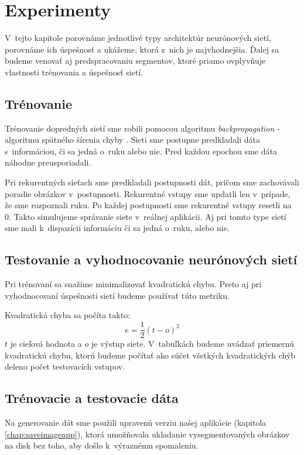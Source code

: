 \chapter{Experimenty}
\label{chap:experiments}

V~tejto kapitole porovnáme jednotlivé typy architektúr neurónových sietí, porovnáme ich úspešnosť a ukážeme, ktorá z~nich je najvhodnejšia. Ďalej sa budeme venovať aj predspracovaniu segmentov, ktoré priamo ovplyvňuje vlastnosti trénovania a úspešnosť sietí.
\bigskip

\section{Trénovanie}

Trénovanie dopredných sietí sme robili pomocou algoritmu \textit{backpropagation} - algoritmu spätného šírenia chyby \cite{haykin1999neural}. Sieti sme postupne predkladali dáta s~informáciou, či sa jedná o~ruku alebo nie. Pred každou epochou sme dáta náhodne preusporiadali. 

Pri rekurentných sieťach sme predkladali postupnosti dát, pričom sme zachovávali poradie obrázkov v~postupnosti. Rekurentné vstupy sme updatli len v~prípade, že sme rozpoznali ruku. Po každej postupnosti sme rekurentné vstupy resetli na 0. Takto simulujeme správanie siete v~reálnej aplikácii. Aj pri tomto type sietí sme mali k~dispozícii informáciu či sa jedná o~ruku, alebo nie.

\section{Testovanie a vyhodnocovanie neurónových sietí}
Pri trénovaní sa snažíme minimalizovať kvadratickú chybu. Preto aj pri vyhodnocovaní úspešnosti sietí budeme používať túto metriku.

Kvadratická chyba sa počíta takto: $$e = \frac{1}{2}(t-o)^2$$
$t$ je cieľová hodnota a $o$ je výstup siete. V~tabuľkách budeme uvádzať priemernú kvadratickú chybu, ktorú budeme počítať ako súčet všetkých kvadratických chýb deleno počet testovacích vstupov. 

\section{Trénovacie a testovacie dáta}
\label{chap:data}

Na generovanie dát sme použili upravenú verziu našej aplikácie (kapitola \ref{chap:saveimageapp}), ktorá umožňovala ukladanie vysegmentovaných obrázkov na disk bez toho, aby došlo k~výraznému spomaleniu. 

